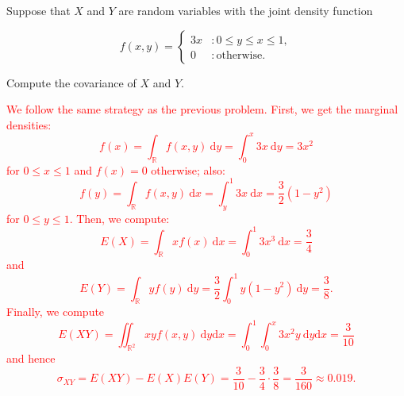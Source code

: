 \documentclass[12pt,reqno]{amsart}
\begin{document}
\bigskip
\prob Suppose that $X$ and $Y$ are random variables with the joint density function

	\[
	f(x,y) = \begin{cases}
	3x & : 0 \leq y\leq x \leq 1, \\
	0 & : \text{otherwise}.
	\end{cases}
	\]
	
Compute the covariance of $X$ and $Y$.


\bigskip
\textcolor{red}{We follow the same strategy as the previous problem. First, we get the marginal densities:
	\[f(x) = \int_{\mathbb{R}} f(x,y) \ \text{d}y = \int_0^x 3x \ \text{d}y = 3x^2
	\]
for $0\leq x \leq 1$ and $f(x)=0$ otherwise; also:
	\[f(y) = \int_{\mathbb{R}} f(x,y) \ \text{d} x = \int_y^1 3x \ \text{d}x = \frac{3}{2}(1-y^2)
	\]
for $0\leq y \leq 1$. Then, we compute:
	\[E(X) = \int_{\mathbb{R}} x f(x) \ \text{d}x = \int_0^1 3x^3 \ \text{d}x = \frac{3}{4}
	\]
and
	\[E(Y) = \int_{\mathbb{R}} y f(y) \ \text{d}y = \frac{3}{2} \int_0^1 y (1-y^2) \ \text{d}y = \frac{3}{8}.
	\]
Finally, we compute
	\[E(XY) = \iint_{\mathbb{R}^2} xy f(x,y) \ \text{d}y\text{d}x = \int_0^1 \int_0^x 3x^2y \ \text{d}y\text{d}x = \frac{3}{10}
	\]
and hence
	\[\sigma_{XY} = E(XY) - E(X) E(Y) = \frac{3}{10} - \frac{3}{4} \cdot \frac{3}{8} = \frac{3}{160} \approx 0.019.
	\]}
	
\end{document}
